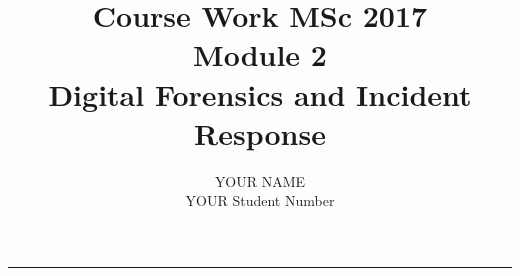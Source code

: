 \documentclass[12pt, british]{article}
\begin{document}
%

\title{Course Work MSc 2017\\
Module 2\\
Digital Forensics and Incident Response}


\author{YOUR NAME\\
YOUR Student Number}

\maketitle
\noindent \begin{center}
\rule[0.5ex]{1\linewidth}{1pt}
\par\end{center}









  
 
\end{document}
